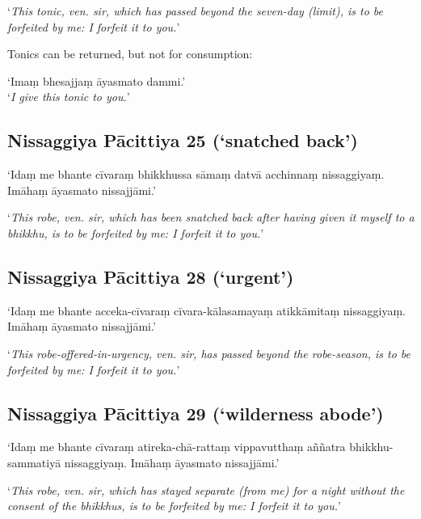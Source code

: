 ‘\emph{This tonic, ven. sir, which has passed beyond the seven-day
  (limit), is to be forfeited by me: I forfeit it to you.}’

Tonics can be returned, but not for consumption:

‘Imaṃ bhesajjaṃ āyasmato dammi.’\\
‘\emph{I give this tonic to you.}’ 

\subsection[NP 25 (‘snatched back’)]{Nissaggiya Pācittiya 25 (‘snatched back’)}

‘Idaṃ me bhante cīvaraṃ bhikkhussa sāmaṃ datvā acchinnaṃ nissaggiyaṃ. Imāhaṃ
āyasmato nissajjāmi.’

‘\emph{This robe, ven. sir, which has been snatched back after having given it
  myself to a bhikkhu, is to be forfeited by me: I forfeit it to you.}’



\subsection[NP 28 (‘urgent’)]{Nissaggiya Pācittiya 28 (‘urgent’)}

‘Idaṃ me bhante acceka-cīvaraṃ cīvara-kālasamayaṃ atikkāmitaṃ nissaggiyaṃ.
Imāhaṃ āyasmato nissajjāmi.’

‘\emph{This robe-offered-in-urgency, ven. sir, has passed beyond the
  robe-season, is to be forfeited by me: I forfeit it to you.}’



\subsection[NP 29 (‘wilderness abode’)]{Nissaggiya Pācittiya 29 (‘wilderness abode’)}

‘Idaṃ me bhante cīvaraṃ atireka-chā-rattaṃ vippavutthaṃ aññatra
bhikkhu-sammatiyā nissaggiyaṃ. Imāhaṃ āyasmato nissajjāmi.’

‘\emph{This robe, ven. sir, which has stayed separate (from me) for a night
  without the consent of the bhikkhus, is to be forfeited by me: I forfeit it to
  you.}’

